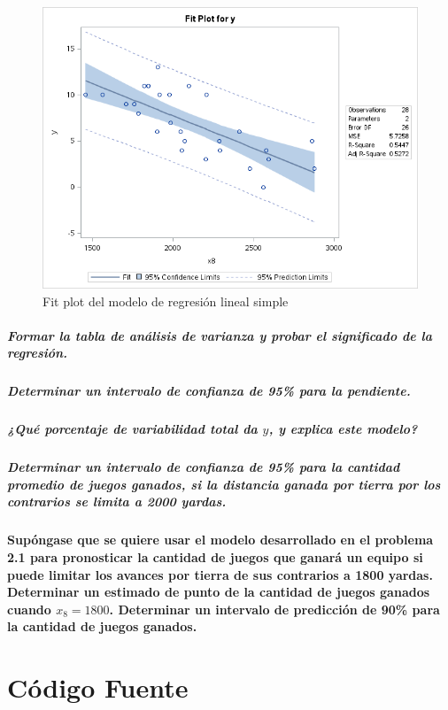 \documentclass{article}
\begin{document}
  \begin{figure}[H]
    \centering
    \includegraphics[width=.8\linewidth]{img/montgomery/fitplot.png}
    \caption{Fit plot del modelo de regresión lineal simple}
    \label{img:mont-fitplot}
  \end{figure}

  \subsubsection{Formar la tabla de análisis de varianza y probar el significado de la regresión.}

  \subsubsection{Determinar un intervalo de confianza de 95\% para la pendiente.}

  \subsubsection{¿Qué porcentaje de variabilidad total da $y$, y explica este modelo?}

  \subsubsection{Determinar un intervalo de confianza de 95\% para la cantidad promedio de juegos ganados, si la distancia ganada por tierra por los contrarios se limita a 2000 yardas.}

  \subsection{Supóngase que se quiere usar el modelo desarrollado en el problema 2.1 para pronosticar la cantidad de juegos que ganará un equipo si puede limitar los avances por tierra de sus contrarios a 1800 yardas. Determinar un estimado de punto de la cantidad de juegos ganados cuando $x_8=1800$. Determinar un intervalo de predicción de 90\% para la cantidad de juegos ganados.}

  \part{Código Fuente}
\end{document}
